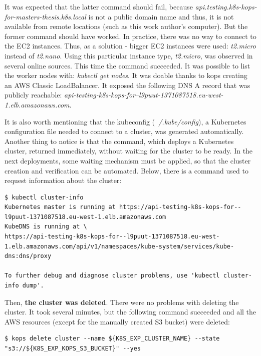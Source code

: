 It was expected that the latter command should fail, because \textit{api.testing.k8s-kops-for-masters-thesis.k8s.local} is not a public domain name and thus, it is not available from remote locations (such as this work author's computer). But the former command should have worked. In practice, there was no way to connect to the EC2 instances. Thus, as a solution - bigger EC2 instances were used: \textit{t2.micro} instead of \textit{t2.nano}. Using this particular instance type, \textit{t2.micro}, was observed in several online sources\cite{online-ha-k8s-blog}\cite{online-perfect-k8s-blog}\cite{online-kops-sa}. This time the command succeeded. It was possible to list the worker nodes with: \textit{kubectl get nodes}. It was doable thanks to kops creating an AWS Classic LoadBalancer. It exposed the following DNS A record that was publicly reachable: \textit{api-testing-k8s-kops-for--l9puut-1371087518.eu-west-1.elb.amazonaws.com}.

It is also worth mentioning that the kubeconfig (\textit{~/.kube/config}), a Kubernetes configuration file needed to connect to a cluster, was generated automatically. Another thing to notice is that the command, which deploys a Kubernetes cluster, returned immediately, without waiting for the cluster to be ready. In the next deployments, some waiting mechanism must be applied, so that the cluster creation and verification can be automated. Below, there is a command used to request information about the cluster:
\begin{lstlisting}[basicstyle=\tiny,caption={Command used to request information about a running Kubernetes cluster}]
$ kubectl cluster-info
Kubernetes master is running at https://api-testing-k8s-kops-for--l9puut-1371087518.eu-west-1.elb.amazonaws.com
KubeDNS is running at \
https://api-testing-k8s-kops-for--l9puut-1371087518.eu-west-1.elb.amazonaws.com/api/v1/namespaces/kube-system/services/kube-dns:dns/proxy

To further debug and diagnose cluster problems, use 'kubectl cluster-info dump'.
\end{lstlisting}

Then, \textbf{the cluster was deleted}. There were no problems with deleting the cluster. It took several minutes, but the following command succeeded and all the AWS resources (except for the manually created S3 bucket) were deleted:

\begin{lstlisting}[basicstyle=\tiny,caption={Command used to delete a Kubernetes cluster created with Kops}]
$ kops delete cluster --name ${K8S_EXP_CLUSTER_NAME} --state "s3://${K8S_EXP_KOPS_S3_BUCKET}" --yes
\end{lstlisting}

